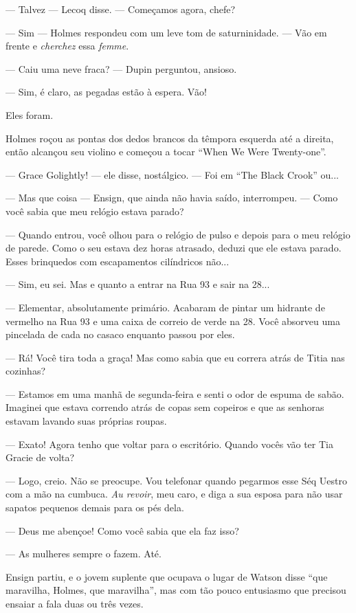 --- Talvez --- Lecoq disse. --- Começamos agora, chefe?

--- Sim --- Holmes respondeu com um leve tom de saturninidade. --- Vão
em frente e \emph{cherchez} essa \emph{femme}.

--- Caiu uma neve fraca? --- Dupin perguntou, ansioso.

--- Sim, é claro, as pegadas estão à espera. Vão!

Eles foram.

Holmes roçou as pontas dos dedos brancos da têmpora esquerda até a
direita, então alcançou seu violino e começou a tocar ``When We Were
Twenty-one''.

--- Grace Golightly! --- ele disse, nostálgico. --- Foi em ``The Black
Crook'' ou...

--- Mas que coisa --- Ensign, que ainda não havia saído, interrompeu.
--- Como você sabia que meu relógio estava parado?

--- Quando entrou, você olhou para o relógio de pulso e depois para o
meu relógio de parede. Como o seu estava dez horas atrasado, deduzi que
ele estava parado. Esses brinquedos com escapamentos cilíndricos não...

--- Sim, eu sei. Mas e quanto a entrar na Rua 93 e sair na 28...

--- Elementar, absolutamente primário. Acabaram de pintar um hidrante de
vermelho na Rua 93 e uma caixa de correio de verde na 28. Você absorveu
uma pincelada de cada no casaco enquanto passou por eles.

--- Rá! Você tira toda a graça! Mas como sabia que eu correra atrás de
Titia nas cozinhas?

--- Estamos em uma manhã de segunda-feira e senti o odor de espuma de
sabão. Imaginei que estava correndo atrás de copas sem copeiros e que as
senhoras estavam lavando suas próprias roupas.

--- Exato! Agora tenho que voltar para o escritório. Quando vocês vão
ter Tia Gracie de volta?

--- Logo, creio. Não se preocupe. Vou telefonar quando pegarmos esse Séq
Uestro com a mão na cumbuca. \emph{Au revoir}, meu caro, e diga a sua
esposa para não usar sapatos pequenos demais para os pés dela.

--- Deus me abençoe! Como você sabia que ela faz isso?

--- As mulheres sempre o fazem. Até.

Ensign partiu, e o jovem suplente que ocupava o lugar de Watson disse
``que maravilha, Holmes, que maravilha'', mas com tão pouco entusiasmo
que precisou ensaiar a fala duas ou três vezes.

